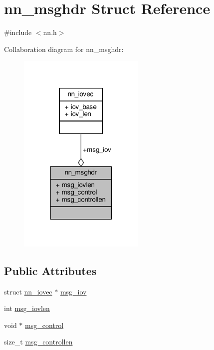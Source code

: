 \hypertarget{structnn__msghdr}{}\section{nn\+\_\+msghdr Struct Reference}
\label{structnn__msghdr}


{\ttfamily \#include $<$nn.\+h$>$}



Collaboration diagram for nn\+\_\+msghdr\+:\nopagebreak
\begin{figure}[H]
\begin{center}
\leavevmode
\includegraphics[width=172pt]{structnn__msghdr__coll__graph}
\end{center}
\end{figure}
\subsection*{Public Attributes}
\begin{DoxyCompactItemize}
\item 
struct \hyperlink{structnn__iovec}{nn\+\_\+iovec} $\ast$ \hyperlink{structnn__msghdr_ad1f1c756e54ba58d8263e6ec4d00cf28}{msg\+\_\+iov}
\item 
int \hyperlink{structnn__msghdr_a0cf9a6f1b92f55a55f0ccc0184f6ff3b}{msg\+\_\+iovlen}
\item 
void $\ast$ \hyperlink{structnn__msghdr_aefe793fcf0d1b3d858e7fc8eaf1325eb}{msg\+\_\+control}
\item 
size\+\_\+t \hyperlink{structnn__msghdr_a100313e447a48a9514790be57cd799a6}{msg\+\_\+controllen}
\end{DoxyCompactItemize}


